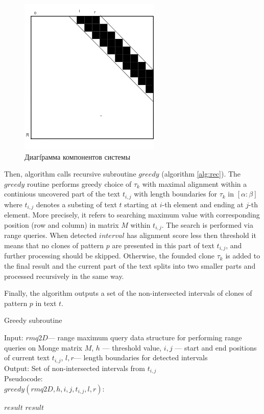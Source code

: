 \begin{figure}[H]
	\centering
    \includegraphics[width=0.4\columnwidth]{figures/M1.png}
    \caption{Диагfрамма компонентов системы}\label{figures:M2}
\end{figure}

Then, algorithm calls recursive subroutine $greedy$ (algorithm \ref{alg:rec}).
The $greedy$ routine performs greedy choice of $\tau_{k}$ with maximal alignment within a continious uncovered part of the text $t_{i,j}$ with length boundaries for $\tau_{k}$ in $[\alpha:\beta]$ where $t_{i,j}$ denotes a substing of text $t$ starting at $i$-th element and ending at $j$-th element.
More precisely, it refers to searching maximum value with corresponding position (row and column) in matrix $M$ within $t_{i,j}$.
The search is performed via range queries.
When detected $interval$ has alignment score less then threshold it means that no clones of pattern $p$ are presented in this part of text $t_{i,j}$, and further processing should be skipped.
Otherwise, the founded clone $\tau_k$ is added to the final result and the current part of the text splits into two smaller parts and processed recursively in the same way.

Finally, the algorithm outputs a set of the non-intersected intervals of clones of pattern $p$ in text $t$.


\begin{algorithm}[H]
\caption{Greedy subroutine}
\label{alg:rec}
Input: $rmq2D$--- range maximum query data structure for performing range queries on Monge matrix $M$, $h$ --- threshold value, $i,j$ --- start and end positions of current text $t_{i,j}$, $l,r$--- length boundaries for detected intervals \\
Output: Set of non-intersected intervals from $t_{i,j}$\\
Pseudocode:\\
$greedy(rmq2D,h, i, j, t_{i,j},l,r ):$

\begin{algorithmic}[1]
\RETURN $result$
\ENDIF
{}
\ENDIF
{}
\ENDIF
\RETURN $result$
\end{algorithmic}
\end{algorithm}


